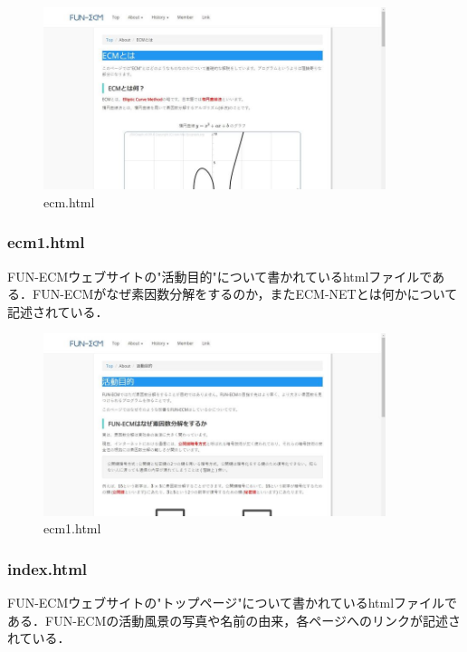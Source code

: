 \documentclass[openany,11pt,papersize]{jsbook}
\begin{document}
\begin{figure}[H]
  \begin{center} %
    \includegraphics[clip, width=10.0cm]{./figure/ecm.png}
    \caption{ecm.html} %
    \label{ecm} %
  \end{center}
\end{figure}

\subsubsection{ecm1.html}
FUN-ECMウェブサイトの"活動目的"について書かれているhtmlファイルである．FUN-ECMがなぜ素因数分解をするのか，またECM-NETとは何かについて記述されている．

\begin{figure}[H]
  \begin{center} %
    \includegraphics[clip, width=10.0cm]{./figure/ecm1.png}
    \caption{ecm1.html} %
    \label{ecm1} %
  \end{center}
\end{figure}

\subsubsection{index.html}
FUN-ECMウェブサイトの"トップページ"について書かれているhtmlファイルである．FUN-ECMの活動風景の写真や名前の由来，各ページへのリンクが記述されている．
\end{document}
